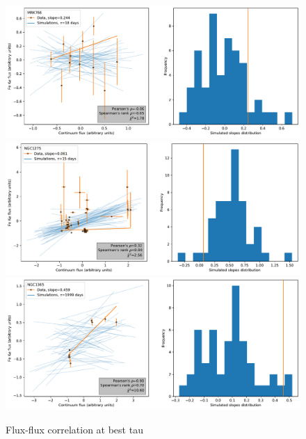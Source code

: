 \begin{figure}
\begin{center}
    {
  \includegraphics[width=\textwidth]{Figs/Chapter5/Flux_corr/Flux_flux_MRK766_besttau.pdf} \\
  \includegraphics[width=\textwidth]{Figs/Chapter5/Flux_corr/Flux_flux_NGC1275_besttau.pdf} \\
  \includegraphics[width=\textwidth]{Figs/Chapter5/Flux_corr/Flux_flux_NGC1365_besttau.pdf}  \\
  \caption{Flux-flux correlation at best tau}
    \label{fig:Flux-flux_all_3}
  }
\end{center}
\end{figure}

